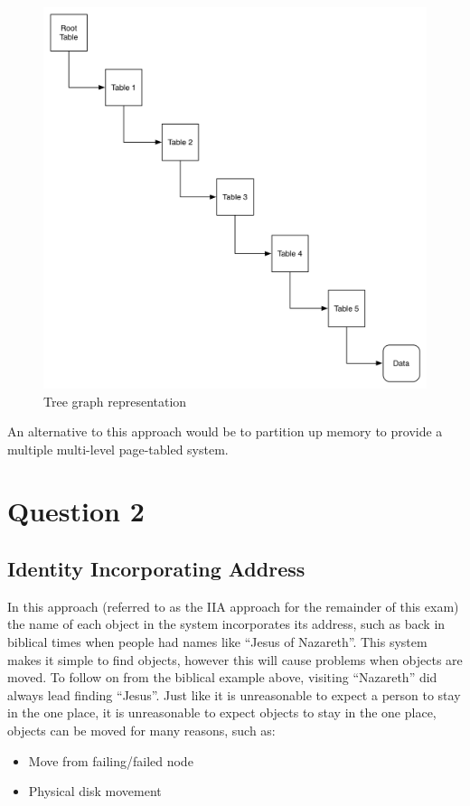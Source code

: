 \documentclass[a4paper,12pt]{article}
\begin{document}
\begin{figure}[ht!]
    \centering
    \includegraphics[width=125mm]{./images/PageTables}
    \caption{Tree graph representation}
    \label{img:tableGraph}
\end{figure}

An alternative to this approach would be to partition up memory to provide a multiple multi-level page-tabled system.

\section*{Question 2}
\subsection*{Identity Incorporating Address}
In this approach (referred to as the IIA approach for the remainder of this exam) the name of each object in the system incorporates its address, such as back in biblical times when people had names like ``Jesus of Nazareth''. 
This system makes it simple to find objects, however this will cause problems when objects are moved.
To follow on from the biblical example above, visiting ``Nazareth'' did always lead finding ``Jesus''.
Just like it is unreasonable to expect a person to stay in the one place, it is unreasonable to expect objects to stay in the one place, objects can be moved for many reasons, such as:
\begin{itemize}
    \item{Move from failing/failed node}
    \item{Physical disk movement}
\end{itemize}
\end{document}
